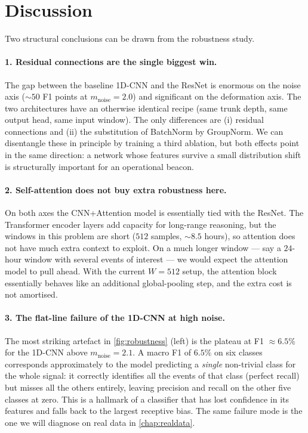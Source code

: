 \section{Discussion}
\label{sec:rob-discuss}

Two structural conclusions can be drawn from the robustness study.

\paragraph{1. Residual connections are the single biggest win.}
The gap between the baseline 1D-CNN and the ResNet is enormous on the
noise axis ($\sim 50$ F1 points at $m_{\text{noise}} = 2.0$) and
significant on the deformation axis. The two architectures have an
otherwise identical recipe (same trunk depth, same output head, same
input window). The only differences are (i) residual connections and
(ii) the substitution of BatchNorm by GroupNorm. We can disentangle
these in principle by training a third ablation, but both effects
point in the same direction: a network whose features survive a small
distribution shift is structurally important for an operational
beacon.

\paragraph{2. Self-attention does not buy extra robustness here.}
On both axes the CNN+Attention model is essentially tied with the
ResNet. The Transformer encoder layers add capacity for long-range
reasoning, but the windows in this problem are short ($512$ samples,
$\sim 8.5$ hours), so attention does not have much extra context to
exploit. On a much longer window --- say a $24$-hour window with
several events of interest --- we would expect the attention model to
pull ahead. With the current $W=512$ setup, the attention block
essentially behaves like an additional global-pooling step, and the
extra cost is not amortised.

\paragraph{3. The flat-line failure of the 1D-CNN at high noise.}
The most striking artefact in \cref{fig:robustness} (left) is the
plateau at F1 $\approx 6.5\%$ for the 1D-CNN above $m_{\text{noise}}
= 2.1$. A macro F1 of $6.5\%$ on six classes corresponds approximately
to the model predicting a \emph{single} non-trivial class for the
whole signal: it correctly identifies all the events of that class
(perfect recall) but misses all the others entirely, leaving precision
and recall on the other five classes at zero. This is a hallmark of a
classifier that has lost confidence in its features and falls back to
the largest receptive bias. The same failure mode is the one we will
diagnose on real data in \cref{chap:realdata}.

